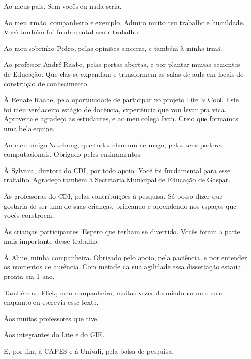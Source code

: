 \begin{agradecimentos}

    Ao meus pais. Sem vocês eu nada seria. 

    Ao meu irmão, companheiro e exemplo. Admiro muito teu trabalho e humildade. Você também foi fundamental neste trabalho. 

    Ao meu sobrinho Pedro, pelas opiniões sinceras, e também à minha irmã.

    Ao professor André Raabe, pelas portas abertas, e por plantar muitas sementes de Educação. Que elas se expandam e transformem as salas de aula em locais de construção de conhecimento.

    À Renate Raabe, pela oportunidade de participar no projeto Lite Is Cool. Este foi meu verdadeiro estágio de docência, experiência que vou levar pra vida. Aproveito e agradeço as estudantes, e ao meu colega Ivan. Creio que formamos uma bela equipe.

    Ao meu amigo Noschang, que todos chamam de mago, pelos seus poderes computacionais. Obrigado pelos ensinamentos.

    À Sylvana, diretora do CDI, por todo apoio. Você foi fundamental para esse trabalho. Agradeço também à Secretaria Municipal de Educação de Gaspar. 

    Às professoras do CDI, pelas contribuições à pesquisa. Só posso dizer que gostaria de ser uma de suas crianças, brincando e aprendendo nos espaços que vocês constroem.
    
    Às crianças participantes. Espero que tenham se divertido. Vocês foram a parte mais importante desse trabalho.

    À Aline, minha companheira. Obrigado pelo apoio, pela paciência, e por entender os momentos de ausência. Com metade da sua agilidade essa dissertação estaria pronta em 1 ano.

    Também ao Flick, meu companheiro, muitas vezes dormindo no meu colo enquanto eu escrevia esse texto.

    Àos muitos professores que tive.

    Àos integrantes do Lite e do GIE.

    E, por fim, à CAPES e à Univali, pela bolsa de pesquisa. 

\end{agradecimentos}